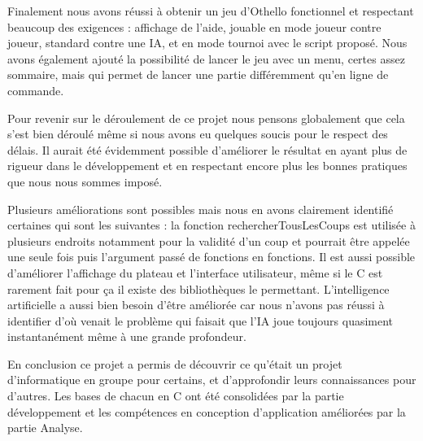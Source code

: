 \hspace{3em}

Finalement nous avons réussi à obtenir un jeu d’Othello fonctionnel et respectant beaucoup des exigences : affichage de l’aide, jouable en mode joueur contre joueur, standard contre une IA, et en mode tournoi avec le script proposé. Nous avons également ajouté la possibilité de lancer le jeu avec un menu, certes assez sommaire, mais qui permet de lancer une partie différemment qu’en ligne de commande.

Pour revenir sur le déroulement de ce projet nous pensons globalement que cela s’est bien déroulé même si nous avons eu quelques soucis pour le respect des délais. Il aurait été évidemment possible d’améliorer le résultat en ayant plus de rigueur dans le développement et en respectant encore plus les bonnes pratiques que nous nous sommes imposé.

Plusieurs améliorations sont possibles mais nous en avons clairement identifié certaines qui sont les suivantes : la fonction rechercherTousLesCoups est utilisée à plusieurs endroits notamment pour la validité d’un coup et pourrait être appelée une seule fois puis l’argument passé de fonctions en fonctions. Il est aussi possible d’améliorer l’affichage du plateau et l’interface utilisateur, même si le C est rarement fait pour ça il existe des bibliothèques le permettant. L’intelligence artificielle a aussi bien besoin d’être améliorée car nous n’avons pas réussi à identifier d’où venait le problème qui faisait que l’IA joue toujours quasiment instantanément même à une grande profondeur.



En conclusion ce projet a permis de découvrir ce qu’était un projet d’informatique en groupe pour certains, et d’approfondir leurs connaissances pour d’autres. Les bases de chacun en C ont été consolidées par la partie développement et les compétences en conception d’application améliorées par la partie Analyse.

